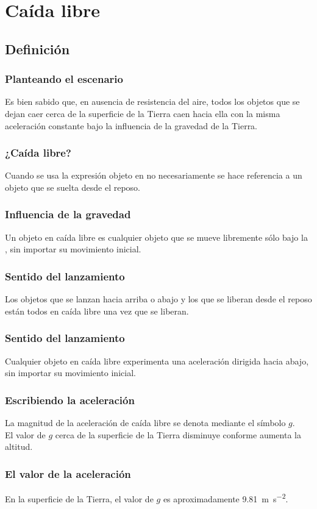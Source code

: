 \documentclass[14pt]{beamer}
\begin{document}
\section{Caída libre}
\subsection{Definición}

\begin{frame}
\frametitle{Planteando el escenario}
Es bien sabido que, en ausencia de resistencia del aire, \pause todos los objetos que se dejan caer cerca de la superficie de la Tierra caen hacia ella con la misma aceleración constante bajo la influencia de la gravedad de la Tierra.
\end{frame}
\begin{frame}
\frametitle{¿Caída libre?}
Cuando se usa la expresión objeto en  no necesariamente se hace referencia a
un objeto que se suelta desde el reposo.
\end{frame}
\begin{frame}
\frametitle{Influencia de la gravedad}
Un objeto en caída libre es cualquier objeto que se mueve libremente sólo bajo la , \pause sin importar su movimiento inicial.
\end{frame}
\begin{frame}
\frametitle{Sentido del lanzamiento}
Los objetos que se lanzan hacia arriba o abajo y los que se liberan desde el reposo están todos en caída libre una vez que se liberan.
\end{frame}
\begin{frame}
\frametitle{Sentido del lanzamiento}
Cualquier objeto en caída libre experimenta una aceleración dirigida hacia abajo, sin importar su movimiento inicial.
\end{frame}
\begin{frame}
\frametitle{Escribiendo la aceleración}
La magnitud de la aceleración de caída libre se denota mediante el símbolo $g$.
\\
\bigskip
\pause
El valor de $g$ cerca de la superficie de la Tierra disminuye conforme aumenta la altitud.
\end{frame}
\begin{frame}
\frametitle{El valor de la aceleración}
En la superficie de la Tierra, el valor de $g$ es aproximadamente \SI{9.81}{\meter\per\square\second}.
\end{frame}
\end{document}
